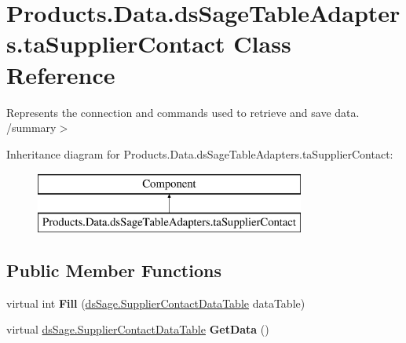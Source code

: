\hypertarget{class_products_1_1_data_1_1ds_sage_table_adapters_1_1ta_supplier_contact}{}\section{Products.\+Data.\+ds\+Sage\+Table\+Adapters.\+ta\+Supplier\+Contact Class Reference}
\label{class_products_1_1_data_1_1ds_sage_table_adapters_1_1ta_supplier_contact}


Represents the connection and commands used to retrieve and save data. /summary$>$  


Inheritance diagram for Products.\+Data.\+ds\+Sage\+Table\+Adapters.\+ta\+Supplier\+Contact\+:\begin{figure}[H]
\begin{center}
\leavevmode
\includegraphics[height=2.000000cm]{class_products_1_1_data_1_1ds_sage_table_adapters_1_1ta_supplier_contact}
\end{center}
\end{figure}
\subsection*{Public Member Functions}
\begin{DoxyCompactItemize}
\item 
virtual int {\bfseries Fill} (\hyperlink{class_products_1_1_data_1_1ds_sage_1_1_supplier_contact_data_table}{ds\+Sage.\+Supplier\+Contact\+Data\+Table} data\+Table)\hypertarget{class_products_1_1_data_1_1ds_sage_table_adapters_1_1ta_supplier_contact_aa7044eca7969ec29b6f3f8f304af91cd}{}\label{class_products_1_1_data_1_1ds_sage_table_adapters_1_1ta_supplier_contact_aa7044eca7969ec29b6f3f8f304af91cd}

\item 
virtual \hyperlink{class_products_1_1_data_1_1ds_sage_1_1_supplier_contact_data_table}{ds\+Sage.\+Supplier\+Contact\+Data\+Table} {\bfseries Get\+Data} ()\hypertarget{class_products_1_1_data_1_1ds_sage_table_adapters_1_1ta_supplier_contact_adb7a636d1a49c31acbf639be328bf280}{}\label{class_products_1_1_data_1_1ds_sage_table_adapters_1_1ta_supplier_contact_adb7a636d1a49c31acbf639be328bf280}

\end{DoxyCompactItemize}

